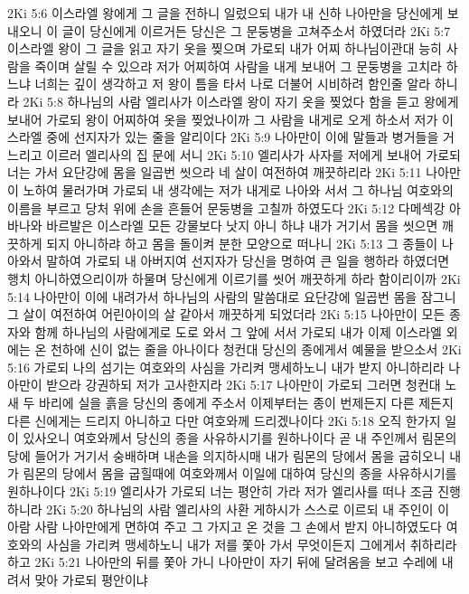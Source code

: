 2Ki 5:6  이스라엘 왕에게 그 글을 전하니 일렀으되 내가 내 신하 나아만을 당신에게 보내오니 이 글이 당신에게 이르거든 당신은 그 문둥병을 고쳐주소서 하였더라
2Ki 5:7  이스라엘 왕이 그 글을 읽고 자기 옷을 찢으며 가로되 내가 어찌 하나님이관대 능히 사람을 죽이며 살릴 수 있으랴 저가 어찌하여 사람을 내게 보내어 그 문둥병을 고치라 하느냐 너희는 깊이 생각하고 저 왕이 틈을 타서 나로 더불어 시비하려 함인줄 알라 하니라
2Ki 5:8  하나님의 사람 엘리사가 이스라엘 왕이 자기 옷을 찢었다 함을 듣고 왕에게 보내어 가로되 왕이 어찌하여 옷을 찢었나이까 그 사람을 내게로 오게 하소서 저가 이스라엘 중에 선지자가 있는 줄을 알리이다
2Ki 5:9  나아만이 이에 말들과 병거들을 거느리고 이르러 엘리사의 집 문에 서니
2Ki 5:10  엘리사가 사자를 저에게 보내어 가로되 너는 가서 요단강에 몸을 일곱번 씻으라 네 살이 여전하여 깨끗하리라
2Ki 5:11  나아만이 노하여 물러가며 가로되 내 생각에는 저가 내게로 나아와 서서 그 하나님 여호와의 이름을 부르고 당처 위에 손을 흔들어 문둥병을 고칠까 하였도다
2Ki 5:12  다메섹강 아바나와 바르발은 이스라엘 모든 강물보다 낫지 아니 하냐 내가 거기서 몸을 씻으면 깨끗하게 되지 아니하랴 하고 몸을 돌이켜 분한 모양으로 떠나니
2Ki 5:13  그 종들이 나아와서 말하여 가로되 내 아버지여 선지자가 당신을 명하여 큰 일을 행하라 하였더면 행치 아니하였으리이까 하물며 당신에게 이르기를 씻어 깨끗하게 하라 함이리이까
2Ki 5:14  나아만이 이에 내려가서 하나님의 사람의 말씀대로 요단강에 일곱번 몸을 잠그니 그 살이 여전하여 어린아이의 살 같아서 깨끗하게 되었더라
2Ki 5:15  나아만이 모든 종자와 함께 하나님의 사람에게로 도로 와서 그 앞에 서서 가로되 내가 이제 이스라엘 외에는 온 천하에 신이 없는 줄을 아나이다 청컨대 당신의 종에게서 예물을 받으소서
2Ki 5:16  가로되 나의 섬기는 여호와의 사심을 가리켜 맹세하노니 내가 받지 아니하리라 나아만이 받으라 강권하되 저가 고사한지라
2Ki 5:17  나아만이 가로되 그러면 청컨대 노새 두 바리에 실을 흙을 당신의 종에게 주소서 이제부터는 종이 번제든지 다른 제든지 다른 신에게는 드리지 아니하고 다만 여호와께 드리겠나이다
2Ki 5:18  오직 한가지 일이 있사오니 여호와께서 당신의 종을 사유하시기를 원하나이다 곧 내 주인께서 림몬의 당에 들어가 거기서 숭배하며 내손을 의지하시매 내가 림몬의 당에서 몸을 굽히오니 내가 림몬의 당에서 몸을 굽힐때에 여호와께서 이일에 대하여 당신의 종을 사유하시기를 원하나이다
2Ki 5:19  엘리사가 가로되 너는 평안히 가라 저가 엘리사를 떠나 조금 진행하니라
2Ki 5:20  하나님의 사람 엘리사의 사환 게하시가 스스로 이르되 내 주인이 이 아람 사람 나아만에게 면하여 주고 그 가지고 온 것을 그 손에서 받지 아니하였도다 여호와의 사심을 가리켜 맹세하노니 내가 저를 쫓아 가서 무엇이든지 그에게서 취하리라 하고
2Ki 5:21  나아만의 뒤를 쫓아 가니 나아만이 자기 뒤에 달려옴을 보고 수레에 내려서 맞아 가로되 평안이냐
